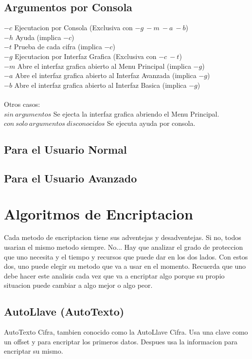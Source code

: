 \documentclass{article}
\begin{document}
		\subsection{Argumentos por Consola}
			$-c$ Ejecutacion por Consola (Exclusiva con $-g\ -m\ -a\ -b$) \\
			\tab $-h$ Ayuda (implica $-c$) \\
			\tab $-t$ Prueba de cada cifra (implica $-c$) \\
			$-g$ Ejecutacion por Interfaz Grafica (Exclusiva con $-c\ -t$) \\
			\tab $-m$ Abre el interfaz grafica abierto al Menu Principal (implica $-g$) \\
			\tab $-a$ Abre el interfaz grafica abierto al Interfaz Avanzada (implica $-g$) \\
			\tab $-b$ Abre el interfaz grafica abierto al Interfaz Basica (implica $-g$) \\
			\\
			Otros casos: \\
			$sin\ argumentos$ Se ejecta la interfaz grafica abriendo el Menu Principal. \\
			$con\ solo\ argumentos\ disconocidos$ Se ejecuta ayuda por consola.
		\subsection{Para el Usuario Normal}
		\subsection{Para el Usuario Avanzado}
	\section{Algoritmos de Encriptacion}
		Cada metodo de encriptacion tiene sus adventejas y desadventejas. Si no, todos usarian el mismo metodo siempre. No... Hay que analizar el grado de proteccion que uno necesita y el tiempo y recursos que puede dar en los dos lados. Con estos dos, uno puede elegir su metodo que va a usar en el momento. Recuerda que uno debe hacer este analisis cada vez que va a encriptar algo porque su propio situacion puede cambiar a algo mejor o algo peor.
		\subsection{AutoLlave (AutoTexto)}
			AutoTexto Cifra, tambien conocido como la AutoLlave Cifra. Usa una clave como un offset y para encriptar los primeros datos. Despues usa la informacion para encriptar su mismo.
\end{document}
